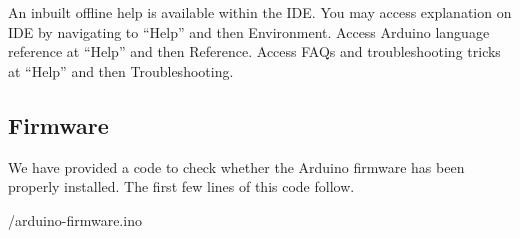 An inbuilt offline help is available within the IDE. You may access
explanation on IDE by navigating to ``Help'' and then
Environment. Access Arduino language reference at ``Help'' and then
Reference. Access FAQs and troubleshooting tricks at ``Help'' and then
Troubleshooting.

\subsection{Firmware}
We have provided a code to check whether the Arduino firmware has been
properly installed.  The first few lines of this code follow.

\begin{ardcode}
      \label{ard:firmware}
      
      {\LocSWfirmcode/arduino-firmware.ino}
\end{ardcode}



